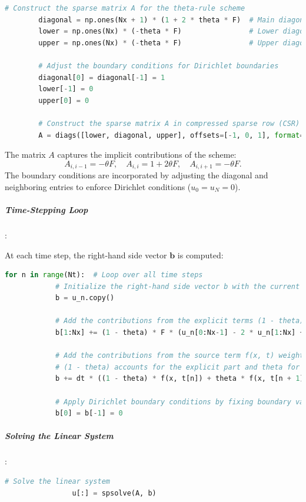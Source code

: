 \documentclass{article}
\begin{document}
			\begin{lstlisting}[language=Python]
		# Construct the sparse matrix A for the theta-rule scheme
		diagonal = np.ones(Nx + 1) * (1 + 2 * theta * F)  # Main diagonal with coefficients 
		lower = np.ones(Nx) * (-theta * F)                # Lower diagonal with coefficients 
		upper = np.ones(Nx) * (-theta * F)                # Upper diagonal with coefficients 
			
		# Adjust the boundary conditions for Dirichlet boundaries
		diagonal[0] = diagonal[-1] = 1  
		lower[-1] = 0                   
		upper[0] = 0                    
				
		# Construct the sparse matrix A in compressed sparse row (CSR) format for efficiency
		A = diags([lower, diagonal, upper], offsets=[-1, 0, 1], format="csr")
			\end{lstlisting}
			
			
			
			The matrix \(A\) captures the implicit contributions of the scheme:
			\[
			A_{i,i-1} = -\theta F, \quad A_{i,i} = 1 + 2\theta F, \quad A_{i,i+1} = -\theta F.
			\]
			The boundary conditions are incorporated by adjusting the diagonal and neighboring entries to enforce Dirichlet conditions (\(u_0 = u_N = 0\)).
			
			\subparagraph{Time-Stepping Loop}:
			
			At each time step, the right-hand side vector \(\mathbf{b}\) is computed:
			
			\begin{lstlisting}[language=Python]
		for n in range(Nt):  # Loop over all time steps
			# Initialize the right-hand side vector b with the current solution
			b = u_n.copy()
				
			# Add the contributions from the explicit terms (1 - theta)F for the spatial derivative
			b[1:Nx] += (1 - theta) * F * (u_n[0:Nx-1] - 2 * u_n[1:Nx] + u_n[2:Nx+1])
				
			# Add the contributions from the source term f(x, t) weighted by theta
			# (1 - theta) accounts for the explicit part and theta for the implicit part
			b += dt * ((1 - theta) * f(x, t[n]) + theta * f(x, t[n + 1]))
				
			# Apply Dirichlet boundary conditions by fixing boundary values to 0
			b[0] = b[-1] = 0
			\end{lstlisting}
			
						
			\subparagraph{Solving the Linear System}:
			
			
			\begin{lstlisting}[language=Python]
				# Solve the linear system
				u[:] = spsolve(A, b)
			\end{lstlisting}
			
\end{document}
